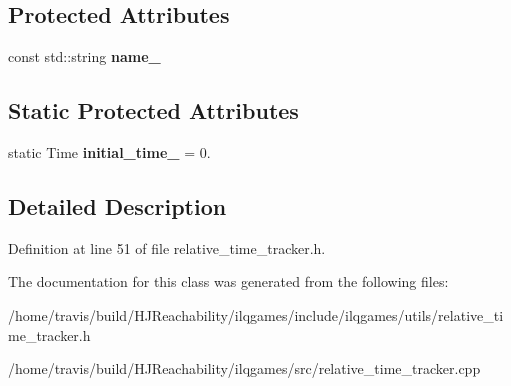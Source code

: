 \subsection*{Protected Attributes}
\begin{DoxyCompactItemize}
\item 
const std\+::string {\bfseries name\+\_\+}\hypertarget{classilqgames_1_1_relative_time_tracker_ae663f7a3181bcf65f3e81428613e3470}{}\label{classilqgames_1_1_relative_time_tracker_ae663f7a3181bcf65f3e81428613e3470}

\end{DoxyCompactItemize}
\subsection*{Static Protected Attributes}
\begin{DoxyCompactItemize}
\item 
static Time {\bfseries initial\+\_\+time\+\_\+} = 0.\hypertarget{classilqgames_1_1_relative_time_tracker_ae1455e2eaad44c35d7f80b80776ae564}{}\label{classilqgames_1_1_relative_time_tracker_ae1455e2eaad44c35d7f80b80776ae564}

\end{DoxyCompactItemize}


\subsection{Detailed Description}


Definition at line 51 of file relative\+\_\+time\+\_\+tracker.\+h.



The documentation for this class was generated from the following files\+:\begin{DoxyCompactItemize}
\item 
/home/travis/build/\+H\+J\+Reachability/ilqgames/include/ilqgames/utils/relative\+\_\+time\+\_\+tracker.\+h\item 
/home/travis/build/\+H\+J\+Reachability/ilqgames/src/relative\+\_\+time\+\_\+tracker.\+cpp\end{DoxyCompactItemize}
